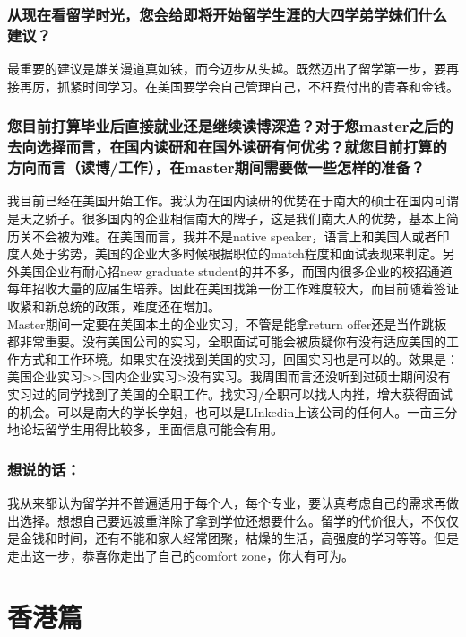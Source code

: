 \documentclass[a4paper,UTF8]{book}
\begin{document}
    \subsubsection*{从现在看留学时光，您会给即将开始留学生涯的大四学弟学妹们什么建议？}
    最重要的建议是雄关漫道真如铁，而今迈步从头越。既然迈出了留学第一步，要再接再厉，抓紧时间学习。在美国要学会自己管理自己，不枉费付出的青春和金钱。

    \subsubsection*{您目前打算毕业后直接就业还是继续读博深造？对于您master之后的去向选择而言，在国内读研和在国外读研有何优劣？就您目前打算的方向而言（读博/工作），在master期间需要做一些怎样的准备？}
    我目前已经在美国开始工作。我认为在国内读研的优势在于南大的硕士在国内可谓是天之骄子。很多国内的企业相信南大的牌子，这是我们南大人的优势，基本上简历关不会被为难。在美国而言，我并不是native speaker，语言上和美国人或者印度人处于劣势，美国的企业大多时候根据职位的match程度和面试表现来判定。另外美国企业有耐心招new graduate student的并不多，而国内很多企业的校招通道每年招收大量的应届生培养。因此在美国找第一份工作难度较大，而目前随着签证收紧和新总统的政策，难度还在增加。\\
    Master期间一定要在美国本土的企业实习，不管是能拿return offer还是当作跳板都非常重要。没有美国公司的实习，全职面试可能会被质疑你有没有适应美国的工作方式和工作环境。如果实在没找到美国的实习，回国实习也是可以的。效果是：美国企业实习>>国内企业实习>没有实习。我周围而言还没听到过硕士期间没有实习过的同学找到了美国的全职工作。找实习/全职可以找人内推，增大获得面试的机会。可以是南大的学长学姐，也可以是LInkedin上该公司的任何人。一亩三分地论坛留学生用得比较多，里面信息可能会有用。

    \subsubsection{想说的话：}
    我从来都认为留学并不普遍适用于每个人，每个专业，要认真考虑自己的需求再做出选择。想想自己要远渡重洋除了拿到学位还想要什么。留学的代价很大，不仅仅是金钱和时间，还有不能和家人经常团聚，枯燥的生活，高强度的学习等等。但是走出这一步，恭喜你走出了自己的comfort zone，你大有可为。





\clearpage
\section{香港篇}
\end{document}
